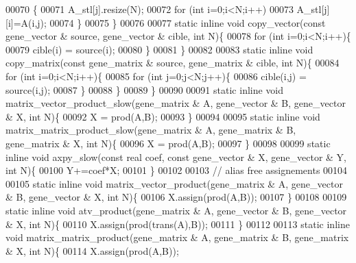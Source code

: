 \begin{DoxyCode}
00070     \{
00071       A\_stl[j].resize(N);
00072       \textcolor{keywordflow}{for} (\textcolor{keywordtype}{int} i=0;i<N;i++)
00073         A\_stl[j][i]=A(i,j);
00074     \}
00075   \}
00076 
00077   \textcolor{keyword}{static} \textcolor{keyword}{inline} \textcolor{keywordtype}{void} copy\_vector(\textcolor{keyword}{const} gene\_vector & source, gene\_vector & cible, \textcolor{keywordtype}{int} N)\{
00078     \textcolor{keywordflow}{for} (\textcolor{keywordtype}{int} i=0;i<N;i++)\{
00079       cible(i) = source(i);
00080     \}
00081   \}
00082 
00083   \textcolor{keyword}{static} \textcolor{keyword}{inline} \textcolor{keywordtype}{void} copy\_matrix(\textcolor{keyword}{const} gene\_matrix & source, gene\_matrix & cible, \textcolor{keywordtype}{int} N)\{
00084     \textcolor{keywordflow}{for} (\textcolor{keywordtype}{int} i=0;i<N;i++)\{
00085       \textcolor{keywordflow}{for} (\textcolor{keywordtype}{int} j=0;j<N;j++)\{
00086         cible(i,j) = source(i,j);
00087       \}
00088     \}
00089   \}
00090 
00091   \textcolor{keyword}{static} \textcolor{keyword}{inline} \textcolor{keywordtype}{void} matrix\_vector\_product\_slow(gene\_matrix & A, gene\_vector & B, gene\_vector & X, \textcolor{keywordtype}{int} N)\{
00092     X =  prod(A,B);
00093   \}
00094 
00095   \textcolor{keyword}{static} \textcolor{keyword}{inline} \textcolor{keywordtype}{void} matrix\_matrix\_product\_slow(gene\_matrix & A, gene\_matrix & B, gene\_matrix & X, \textcolor{keywordtype}{int} N)\{
00096     X =  prod(A,B);
00097   \}
00098 
00099   \textcolor{keyword}{static} \textcolor{keyword}{inline} \textcolor{keywordtype}{void} axpy\_slow(\textcolor{keyword}{const} real coef, \textcolor{keyword}{const} gene\_vector & X, gene\_vector & Y, \textcolor{keywordtype}{int} N)\{
00100     Y+=coef*X;
00101   \}
00102 
00103   \textcolor{comment}{// alias free assignements}
00104 
00105   \textcolor{keyword}{static} \textcolor{keyword}{inline} \textcolor{keywordtype}{void} matrix\_vector\_product(gene\_matrix & A, gene\_vector & B, gene\_vector & X, \textcolor{keywordtype}{int} N)\{
00106     X.assign(prod(A,B));
00107   \}
00108 
00109   \textcolor{keyword}{static} \textcolor{keyword}{inline} \textcolor{keywordtype}{void} atv\_product(gene\_matrix & A, gene\_vector & B, gene\_vector & X, \textcolor{keywordtype}{int} N)\{
00110     X.assign(prod(trans(A),B));
00111   \}
00112 
00113   \textcolor{keyword}{static} \textcolor{keyword}{inline} \textcolor{keywordtype}{void} matrix\_matrix\_product(gene\_matrix & A, gene\_matrix & B, gene\_matrix & X, \textcolor{keywordtype}{int} N)\{
00114     X.assign(prod(A,B));

\end{DoxyCode}
